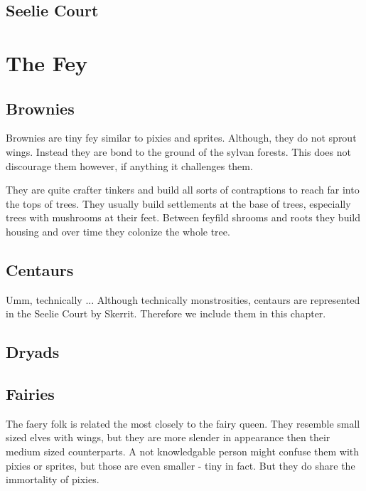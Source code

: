 \documentclass[letter,10pt,twocolumn,openany]{dndbook}
\begin{document}
\section{Seelie Court}

\chapter{The Fey}

\section{Brownies}

Brownies are tiny fey similar to pixies and sprites.
Although, they do not sprout wings.
Instead they are bond to the ground of the sylvan forests.
This does not discourage them however, if anything it challenges them.


They are quite crafter tinkers and build all sorts of contraptions to reach far into the tops of trees.
They usually build settlements at the base of trees, especially trees with mushrooms at their feet.
Between feyfild shrooms and roots they build housing and over time they colonize the whole tree.

\section{Centaurs}

\begin{DndComment}{Umm, technically ...}
  Although technically monstrosities, centaurs are represented in the Seelie Court by Skerrit.
  Therefore we include them in this chapter.
\end{DndComment}

\section{Dryads}

\section{Fairies}

The faery folk is related the most closely to the fairy queen.
They resemble small sized elves with wings, but they are more slender in appearance then their medium sized counterparts.
A not knowledgable person might confuse them with pixies or sprites, but those are even smaller - tiny in fact.
But they do share the immortality of pixies.
\end{document}
